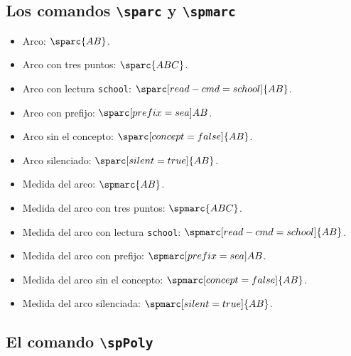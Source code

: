 \documentclass{article}
\begin{document}
\subsection*{Los comandos \texttt{\textbackslash sparc} y \texttt{\textbackslash spmarc}}

\begin{itemize}
  \item Arco: $\sparc{AB}$.
  \item Arco con tres puntos: $\sparc{ABC}$.
  \item Arco con lectura \texttt{school}: $\sparc[read-cmd=school]{AB}$.
  \item Arco con prefijo: $\sparc[prefix={sea}]{AB}$.
  \item Arco sin el concepto: $\sparc[concept=false]{AB}$.
  \item Arco silenciado: $\sparc[silent=true]{AB}$.
  \item Medida del arco: $\spmarc{AB}$.
  \item Medida del arco con tres puntos: $\spmarc{ABC}$.
  \item Medida del arco con lectura \texttt{school}: $\spmarc[read-cmd=school]{AB}$.
  \item Medida del arco con prefijo: $\spmarc[prefix={sea}]{AB}$.
  \item Medida del arco sin el concepto: $\spmarc[concept=false]{AB}$.
  \item Medida del arco silenciada: $\spmarc[silent=true]{AB}$.
\end{itemize}

\subsection*{El comando \texttt{\textbackslash spPoly}}
\end{document}

